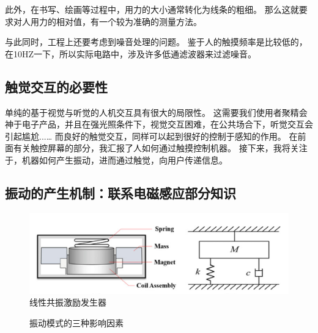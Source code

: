\documentclass[UTF-8]{ctexart}
\begin{document}
此外，在书写、绘画等过程中，用力的大小通常转化为线条的粗细。
那么这就要求对人用力的相对值，有一个较为准确的测量方法。

与此同时，工程上还要考虑到噪音处理的问题。
鉴于人的触摸频率是比较低的，在10HZ一下，所以实际电路中，涉及许多低通滤波器来过滤噪音。
\subsection{触觉交互的必要性}

单纯的基于视觉与听觉的人机交互具有很大的局限性。
这需要我们使用者聚精会神于电子产品，并且在强光照条件下，视觉交互困难，在公共场合下，听觉交互会引起尴尬...\dots
而良好的触觉交互，同样可以起到很好的控制于感知的作用。
在前面有关触控屏幕的部分，我汇报了人如何通过触摸控制机器。
接下来，我将关注于，机器如何产生振动，进而通过触觉，向用户传递信息。
\subsection{振动的产生机制：联系电磁感应部分知识}
\begin{figure}
    \centering
    \includegraphics[width=0.6\linewidth]{../Figures/oscillator.png}
    \caption{线性共振激励发生器\cite{Touch}}
    \label{线性共振激励发生器}
\end{figure}
\begin{figure}
    \centering
    \caption{振动模式的三种影响因素}
    \label{振动模式}
\end{figure}
\end{document}
